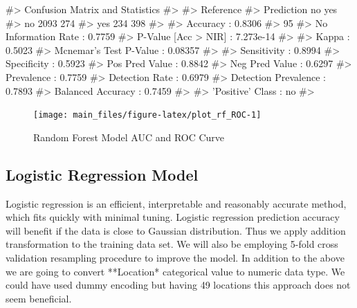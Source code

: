 \begin{Schunk}
\begin{Soutput}
#> Confusion Matrix and Statistics
#> 
#>           Reference
#> Prediction   no  yes
#>        no  2093  274
#>        yes  234  398
#>                                           
#>                Accuracy : 0.8306          
#>                  95%
#>     No Information Rate : 0.7759          
#>     P-Value [Acc > NIR] : 7.273e-14       
#>                                           
#>                   Kappa : 0.5023          
#>  Mcnemar's Test P-Value : 0.08357         
#>                                           
#>             Sensitivity : 0.8994          
#>             Specificity : 0.5923          
#>          Pos Pred Value : 0.8842          
#>          Neg Pred Value : 0.6297          
#>              Prevalence : 0.7759          
#>          Detection Rate : 0.6979          
#>    Detection Prevalence : 0.7893          
#>       Balanced Accuracy : 0.7459          
#>                                           
#>        'Positive' Class : no              
#> 
\end{Soutput}
\end{Schunk}

\begin{Schunk}
\begin{figure}[H]

{\centering \texttt{[image: main\_files/figure-latex/plot\_rf\_ROC-1]} 

}

\caption[Random Forest Model AUC and ROC Curve]{Random Forest Model AUC and ROC Curve}\label{fig:plot_rf_ROC}
\end{figure}
\end{Schunk}

\hypertarget{logistic-regression-model}{%
\subsection{Logistic Regression Model}\label{logistic-regression-model}}

Logistic regression is an efficient, interpretable and reasonably
accurate method, which fits quickly with minimal tuning. Logistic
regression prediction accuracy will benefit if the data is close to
Gaussian distribution. Thus we apply addition transformation to the
training data set. We will also be employing 5-fold cross validation
resampling procedure to improve the model. In addition to the above we
are going to convert **Location* categorical value to numeric data type.
We could have used dummy encoding but having 49 locations this approach
does not seem beneficial.

